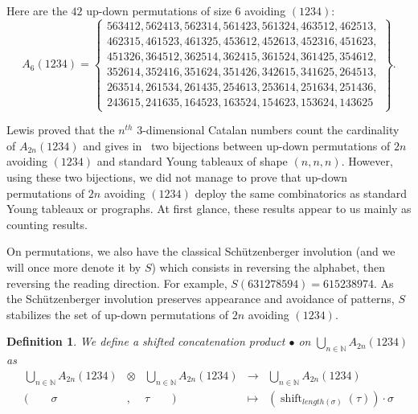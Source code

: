 \documentclass{amsart}
\newtheorem{definition}[theorem]{Definition}
\begin{document}
Here are the $42$ up-down permutations of size $6$ avoiding $(1234)$:
\begin{equation}
  A_{6}(1234) = \left\{
  \begin{array}{c}
    563412, 562413, 562314, 561423, 561324, 463512, 462513, \\
    462315, 461523, 461325, 453612, 452613, 452316, 451623, \\
    451326, 364512, 362514, 362415, 361524, 361425, 354612, \\
    352614, 352416, 351624, 351426, 342615, 341625, 264513, \\
    263514, 261534, 261435, 254613, 253614, 251634, 251436, \\
    243615, 241635, 164523, 163524, 154623, 153624, 143625 
  \end{array}
  \right\}.
\end{equation}

Lewis proved that the $n^{th}$ $3$-dimensional Catalan numbers
count the cardinality of $A_{2n}(1234)$ and gives in~\cite{Lewis1,
  Lewis2} two bijections between up-down permutations of $2n$
avoiding $(1234)$ and standard Young tableaux of shape $(n,n,n)$. However,
using these two bijections, we did not manage to prove that up-down
permutations of $2n$ avoiding $(1234)$ deploy the same combinatorics
as standard Young tableaux or prographs. At first glance, these results
appear to us mainly as counting results.


On permutations, we also have the classical Schützenberger involution
(and we will once more denote it by $S$) which consists in reversing
the alphabet, then reversing the reading direction. For example,
$S(631278594) = 615238974$. As the Schützenberger involution
preserves appearance and avoidance of patterns, $S$ stabilizes the set
of up-down permutations of $2n$ avoiding $(1234)$.

\begin{definition}
  We define a shifted concatenation product $\bullet$ on
  $\bigcup_{n \in \mathbb{N}} A_{2n}(1234)$ as
  \begin{equation}
    \begin{array}{ccccl}
      \displaystyle\bigcup_{n \in \mathbb{N}} A_{2n}(1234) & \otimes & \displaystyle\bigcup_{n \in \mathbb{N}} A_{2n}(1234) & \longrightarrow & \displaystyle\bigcup_{n \in \mathbb{N}} A_{2n}(1234) \\
      (\qquad \sigma & , & \tau \qquad) & \longmapsto & (\operatorname{shift}_{length(\sigma)}(\tau)) \cdot \sigma \\
    \end{array}
  \end{equation}
\end{definition}
\end{document}
